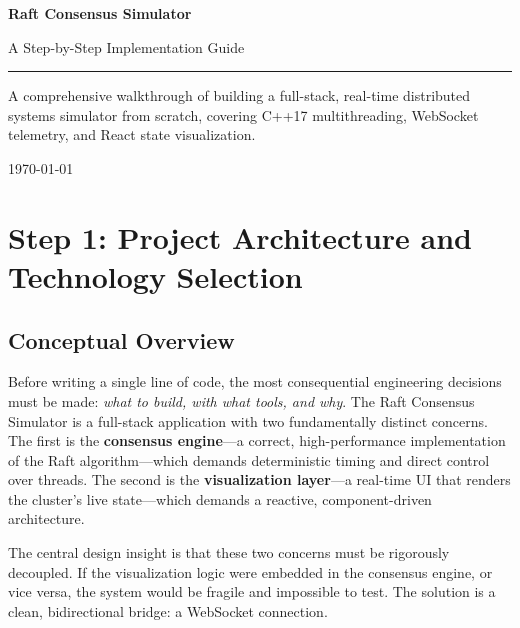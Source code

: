 \documentclass[11pt, a4paper]{article}
\begin{document}
\begin{titlepage}
    \centering
    \vspace*{3cm}
    {\Huge\bfseries\color{accentblue} Raft Consensus Simulator\par}
    \vspace{0.5cm}
    {\Large A Step-by-Step Implementation Guide\par}
    \vspace{1cm}
    \rule{0.6\textwidth}{1pt}
    \vspace{1cm}
    {\large A comprehensive walkthrough of building a full-stack,
    real-time distributed systems simulator from scratch, covering
    C++17 multithreading, WebSocket telemetry, and React state
    visualization.\par}
    \vfill
    {\large \today\par}
\end{titlepage}

\tableofcontents
\newpage

\section{Step 1: Project Architecture and Technology Selection}

\subsection{Conceptual Overview}
Before writing a single line of code, the most consequential engineering
decisions must be made: \textit{what to build, with what tools, and why}.
The Raft Consensus Simulator is a full-stack application with two
fundamentally distinct concerns. The first is the \textbf{consensus
engine}---a correct, high-performance implementation of the Raft
algorithm---which demands deterministic timing and direct control over
threads. The second is the \textbf{visualization layer}---a real-time UI
that renders the cluster's live state---which demands a reactive,
component-driven architecture.

The central design insight is that these two concerns must be rigorously
decoupled. If the visualization logic were embedded in the consensus engine,
or vice versa, the system would be fragile and impossible to test. The
solution is a clean, bidirectional bridge: a WebSocket connection.
\end{document}
